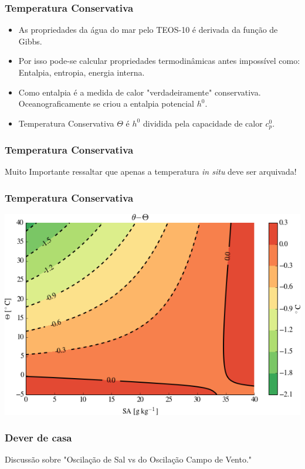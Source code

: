 \begin{frame}
\frametitle{Temperatura Conservativa}
    \begin{itemize}[<+-| alert@+>]
        \item As propriedades da água do mar pelo TEOS-10 é derivada da função de
              Gibbs.
        \item Por isso pode-se calcular  propriedades termodinâmicas antes
              impossível como: Entalpia, entropia, energia interna.
        \item Como entalpia é a medida de calor "verdadeiramente" conservativa.
              Oceanograficamente se criou a entalpia potencial $h^0$.
        \item Temperatura Conservativa $\Theta$ é $h^0$ dividida pela
              capacidade de calor $c_p^0$.
    \end{itemize}
\end{frame}

\begin{frame}
\frametitle{Temperatura Conservativa}
    \begin{block}{}
        Muito Importante ressaltar que apenas a temperatura {\it in situ} deve
        ser arquivada!
    \end{block}
\end{frame}

\begin{frame}
\frametitle{Temperatura Conservativa}
    \begin{center}
        \includegraphics[scale=0.45]{./figures/conservative_temperature.png}
    \end{center}
\end{frame}

\begin{frame}
\frametitle{Dever de casa}
    \begin{block}{}
        Discussão sobre "Oscilação de Sal vs do Oscilação Campo de Vento."
    \end{block}
\end{frame}


